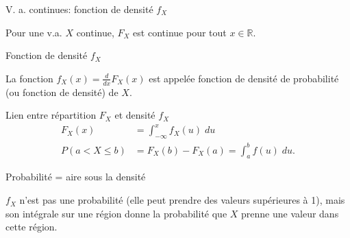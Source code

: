 \documentclass[handout]{BeamerTemplate}
\begin{document}
\begin{frame}[t]{V. a. continues: fonction de densité $f_X$}

{\small
Pour une v.a. $X$ continue, $F_X$ est continue
pour tout $x\in\mathbb{R}$. }
\begin{Boite}{Fonction de densité $f_X$}


La fonction $\displaystyle f_X(x)=\frac{d}{dx}F_X(x)$ est appelée \alert{fonction de densité
de probabilité} (ou \alert{fonction de densité}) de $X$.
\end{Boite}

\begin{Boite}{Lien entre répartition $F_X$ et densité $f_X$}
\begin{align*}
 F_X(x)&=\int_{-\infty}^x f_X(u)\;du \\
 P(a<X\le b)&=F_X(b)-F_X(a)=\int_a^bf(u)\;du.
\end{align*}
\end{Boite}

\end{frame}

\begin{frame}[t]{Probabilité = aire sous la densité}
\begin{center}
    
\end{center}

{\small
$f_X$ n'est \alert{pas} une probabilité (elle peut prendre des valeurs
supérieures à 1), mais son intégrale sur une région donne la
probabilité que $X$ prenne une valeur dans cette région. %
}
\end{frame}
\end{document}
